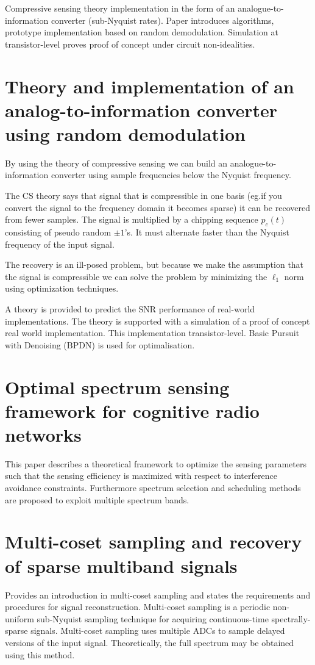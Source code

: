 \documentclass[report, oneside, a4paper, openany]{memoir}
\begin{document}
Compressive sensing theory implementation in the form of an analogue-to-information converter (sub-Nyquist rates). Paper introduces algorithms, prototype implementation based on random demodulation. Simulation at transistor-level proves proof of concept under circuit non-idealities.
\section{Theory and implementation of an analog-to-information converter using random demodulation \cite{laska2007theory}}
By using the theory of compressive sensing we can build an analogue-to-information converter using sample frequencies below the Nyquist frequency.

The CS theory says that signal that is compressible in one basis (eg.if you convert the signal to the frequency domain it becomes sparse) it can be recovered from fewer samples. The signal is multiplied by a chipping sequence $p_c(t)$ consisting of pseudo random $\pm1$'s. It must alternate faster than the Nyquist frequency of the input signal.

The recovery is an ill-posed problem, but because we make the assumption that the signal is compressible we can solve the problem by minimizing the $\ell_1$ norm using optimization techniques.

A theory is provided to predict the SNR performance of real-world implementations. The theory is supported with a simulation of a proof of concept real world implementation. This implementation transistor-level. Basic Pursuit with Denoising (BPDN) is used for optimalisation.
\section{Optimal spectrum sensing framework for cognitive radio networks \cite{lee2008optimal}}
This paper describes a theoretical framework to optimize the sensing parameters such that the sensing efficiency is maximized with respect to interference avoidance constraints. Furthermore spectrum selection and scheduling methods are proposed to exploit multiple spectrum bands.
\section{Multi-coset sampling and recovery of sparse multiband signals \cite{lexa2011multi}}
Provides an introduction in multi-coset sampling and states the requirements and procedures for signal reconstruction. Multi-coset sampling is a periodic non-uniform sub-Nyquist sampling technique for acquiring continuous-time spectrally-sparse signals. Multi-coset sampling uses multiple ADCs to sample delayed versions of the input signal. Theoretically, the full spectrum may be obtained using this method.
\end{document}
